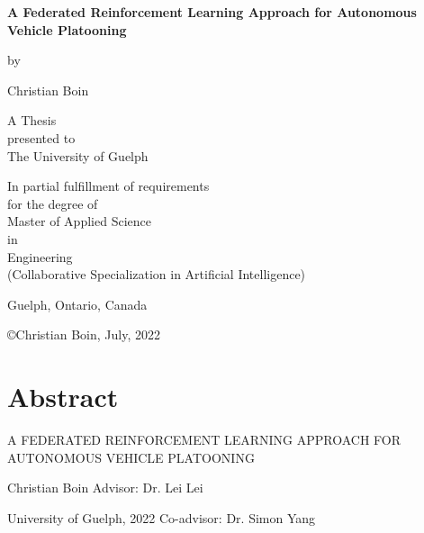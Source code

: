 \documentclass[oneside, 12pt]{book}
\let\oldfrontmatter\frontmatter
\gdef\frontmatter{\oldfrontmatter\pagestyle{plain}}
\begin{document}
\frontmatter
\begin{titlepage}
	\setlength{\parskip}{12pt}
	\centering
	{\textbf{\LARGE A Federated Reinforcement Learning Approach for Autonomous Vehicle Platooning}\par}
	\vspace{1.5 cm}
	{by}\par
	{Christian Boin}\par
	\vspace{2cm}
	{A Thesis\\
	presented to\\
	The University of Guelph}\par
	\vspace{2cm}
	{In partial fulfillment of requirements\\
	for the degree of\\
	Master of Applied Science\\
	in\\
	Engineering\\
	(Collaborative Specialization in Artificial Intelligence)}\par
	\vspace{2cm}
	{\normalsize Guelph, Ontario, Canada}\par
	\vspace{0.25cm}
	{\copyright\hspace{6pt}Christian Boin, July, 2022}\par
\end{titlepage}

\addtocounter{page}{1} %

\chapter*{\centering Abstract}
\thispagestyle{empty} %
\pagestyle{empty} %
\begin{center} A FEDERATED REINFORCEMENT LEARNING APPROACH FOR AUTONOMOUS VEHICLE PLATOONING \end{center}

\noindent Christian Boin \hfill Advisor: Dr. Lei Lei

\noindent University of Guelph, 2022  \hfill Co-advisor: Dr. Simon Yang
\vspace{12pt}
\end{document}

